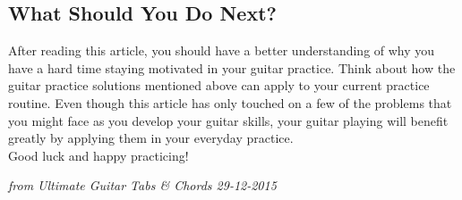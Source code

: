 \subsection*{What Should You Do Next?}
After reading this article, you should have a better understanding of why you have a hard time staying motivated in your guitar practice. Think about how the guitar practice solutions mentioned above can apply to your current practice routine. Even though this article has only touched on a few of the problems that you might face as you develop your guitar skills, your guitar playing will benefit greatly by applying them in your everyday practice.\\
Good luck and happy practicing!

\em{from Ultimate Guitar Tabs \& Chords 29-12-2015}
